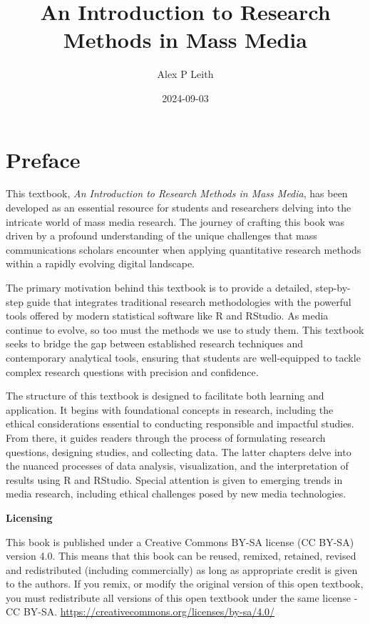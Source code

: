\documentclass[
]{book}
\title{An Introduction to Research Methods in Mass Media}
\author{Alex P Leith}
\date{2024-09-03}
\begin{document}
\maketitle

{
\setcounter{tocdepth}{1}
\tableofcontents
}
\chapter*{Preface}\label{preface}

This textbook, \emph{An Introduction to Research Methods in Mass Media}, has been developed as an essential resource for students and researchers delving into the intricate world of mass media research. The journey of crafting this book was driven by a profound understanding of the unique challenges that mass communications scholars encounter when applying quantitative research methods within a rapidly evolving digital landscape.

The primary motivation behind this textbook is to provide a detailed, step-by-step guide that integrates traditional research methodologies with the powerful tools offered by modern statistical software like R and RStudio. As media continue to evolve, so too must the methods we use to study them. This textbook seeks to bridge the gap between established research techniques and contemporary analytical tools, ensuring that students are well-equipped to tackle complex research questions with precision and confidence.

The structure of this textbook is designed to facilitate both learning and application. It begins with foundational concepts in research, including the ethical considerations essential to conducting responsible and impactful studies. From there, it guides readers through the process of formulating research questions, designing studies, and collecting data. The latter chapters delve into the nuanced processes of data analysis, visualization, and the interpretation of results using R and RStudio. Special attention is given to emerging trends in media research, including ethical challenges posed by new media technologies.

\textbf{Licensing}

This book is published under a Creative Commons BY-SA license (CC BY-SA) version 4.0. This means that this book can be reused, remixed, retained, revised and redistributed (including commercially) as long as appropriate credit is given to the authors. If you remix, or modify the original version of this open textbook, you must redistribute all versions of this open textbook under the same license - CC BY-SA. \url{https://creativecommons.org/licenses/by-sa/4.0/}
\end{document}
